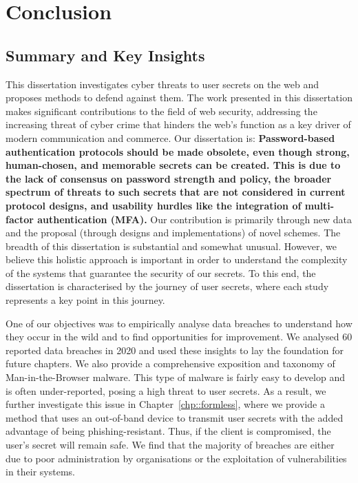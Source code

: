 \chapter{Conclusion}
\label{chp::conclusion}

\section{Summary and Key Insights}

This dissertation investigates cyber threats to user secrets on the web and proposes methods to defend against them. The work presented in this dissertation makes significant contributions to the field of web security, addressing the increasing threat of cyber crime that hinders the web's function as a key driver of modern communication and commerce. Our dissertation is: \textbf{Password-based authentication protocols should be made obsolete, even though strong, human-chosen, and memorable secrets can be created. This is due to the lack of consensus on password strength and policy, the broader spectrum of threats to such secrets that are not considered in current protocol designs, and usability hurdles like the integration of multi-factor authentication (MFA).} Our contribution is primarily through new data and the proposal (through designs and implementations) of novel schemes. The breadth of this dissertation is substantial and somewhat unusual. However, we believe this holistic approach is important in order to understand the complexity of the systems that guarantee the security of our secrets. To this end, the dissertation is characterised by the journey of user secrets, where each study represents a key point in this journey.

One of our objectives was to empirically analyse data breaches to understand how they occur in the wild and to find opportunities for improvement. We analysed 60 reported data breaches in 2020 and used these insights to lay the foundation for future chapters. We also provide a comprehensive exposition and taxonomy of Man-in-the-Browser malware. This type of malware is fairly easy to develop and is often under-reported, posing a high threat to user secrets. As a result, we further investigate this issue in Chapter~\ref{chp::formless}, where we provide a method that uses an out-of-band device to transmit user secrets with the added advantage of being phishing-resistant. Thus, if the client is compromised, the user's secret will remain safe. We find that the majority of breaches are either due to poor administration by organisations or the exploitation of vulnerabilities in their systems.

